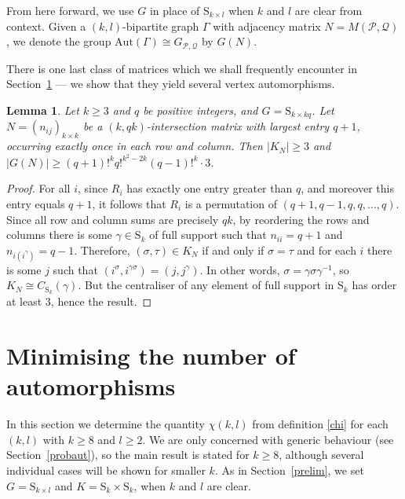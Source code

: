 \documentclass{daj}
\renewcommand\S{\mathrm{S}}
\newcommand\Aut{\mathrm{Aut}}
\renewcommand\P{\mathcal{P}}
\newcommand\Q{\mathcal{Q}}
\theoremstyle{plain}
\newtheorem{lemma}[theorem]{Lemma}
\theoremstyle{definition}
\begin{document}
From here forward, we use $G$ in place of $\S_{k\times l}$ when $k$ and $l$ are clear from context. 
Given a $(k,l)$-bipartite graph $\Gamma$ with adjacency matrix $N=M(\P,\Q)$, we denote the group $\Aut(\Gamma)\cong G_{\P,\Q}$ by $G(N)$.

There is one last class of matrices which we shall frequently encounter in Section~\ref{minaut} --- we show that they yield several vertex automorphisms.
\begin{lemma}\label{centbound}
Let $k\geq3$ and $q$ be positive integers, and $G=\S_{k\times kq}$. Let $N=(n_{ij})_{k\times k}$ be a $(k,qk)$-intersection matrix with largest entry $q+1$, occurring exactly once in each row and column. Then $|K_N|\geq 3$ and  $|G(N)|\geq (q+1)!^kq!^{k^2-2k}(q-1)!^k\cdot 3$.
\end{lemma}
\begin{proof}
For all $i$, since $R_i$ has exactly one entry greater than $q$, and moreover this entry equals $q+1$, it follows that $R_i$ is a permutation of $(q+1,q-1,q,q,\dots,q)$. Since all row and column sums are precisely $qk$, by reordering the rows and columns there is some $\gamma\in \S_k$ of full support such that $n_{ii}=q+1$ and $n_{i(i^\gamma)}=q-1$. Therefore, $(\sigma,\tau)\in K_N$ if and only if $\sigma=\tau$ and for each $i$ there is some $j$ such that $(i^\sigma,i^{\gamma\sigma})=(j,j^{\gamma})$. In other words, $\sigma=\gamma\sigma\gamma^{-1}$, so $K_N\cong C_{\S_k}(\gamma)$. But the centraliser of any element of full support in $\S_k$ has order at least $3$, hence the result.
\end{proof}

\section{Minimising the number of automorphisms}\label{minaut}
In this section we determine the quantity $\chi(k,l)$ from definition \eqref{chi} for each $(k,l)$ with $k\geq 8$ and $l\geq 2$. We are only concerned with generic behaviour (see Section~\ref{probaut}), so the main result is stated for $k\geq 8$, although several individual cases will be shown for smaller $k$. As in Section~\ref{prelim}, we set $G=\S_{k\times l}$ and $K=\S_k\times \S_k$, when $k$ and $l$ are clear.
\end{document}
